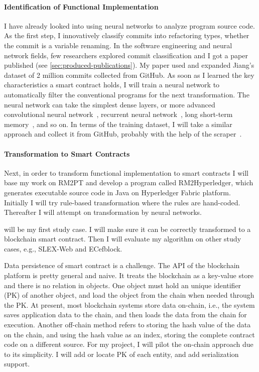 \paragraph*{Identification of Functional Implementation}
I have already looked into using neural networks to analyze program source code.
As the first step, I innovatively classify commits into refactoring types, whether the commit is a variable renaming.
In the software engineering and neural network fields, few researchers explored commit classification and I got a paper published (see \autoref{sec:produced-publications}).
My paper used and expanded Jiang's dataset of 2 million commits collected from GitHub.
As soon as I learned the key characteristics a smart contract holds, I will train a neural network to automatically filter the conventional programs for the next transformation.
The neural network can take the simplest dense layers, or more advanced convolutional neural network~\cite{albawi2017understanding}, recurrent neural network~\cite{tarwani2017survey}, long short-term memory~\cite{skovajsova2017long}, and so on.
In terms of the training dataset, I will take a similar approach and collect it from GitHub, probably with the help of the scraper~\cite{alexandru2017replicating}.


\paragraph*{Transformation to Smart Contracts}
Next, in order to transform functional implementation to smart contracts
I will base my work on RM2PT and develop a program called RM2Hyperledger, which generates executable source code in Java on Hyperledger Fabric platform.
Initially I will try rule-based transformation where the rules are hand-coded. Thereafter I will attempt on transformation by neural networks.

{\cocome} will be my first study case. I will make sure it can be correctly transformed to a blockchain smart contract. Then I will evaluate my algorithm on other study cases, e.g., SLEX-Web and ECefblock.


Data persistence of smart contract is a challenge.
The API of the blockchain platform is pretty general and naive. It treats the blockchain as a key-value store and there is no relation in objects. One object must hold an unique identifier (PK) of another object, and load the object from the chain when needed through the PK.
At present, most blockchain systems store data on-chain, i.e., the system saves application data to the chain, and then loads the data from the chain for execution.
Another off-chain method refers to storing the hash value of the data on the chain, and using the hash value as an index, storing the complete contract code on a different source.
For my project, I will pilot the on-chain approach due to its simplicity. I will add or locate PK of each entity, and add serialization support.


